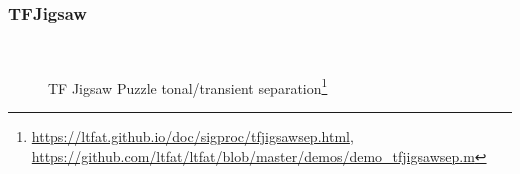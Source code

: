\documentclass{beamer}
\begin{document}
\begin{frame}
	\frametitle{TFJigsaw}
	\begin{figure}[ht]
		\vspace{-1em}
		\\
		\vspace{-1em}
		\caption{TF Jigsaw Puzzle tonal/transient separation\footnote{\url{https://ltfat.github.io/doc/sigproc/tfjigsawsep.html}, \url{https://github.com/ltfat/ltfat/blob/master/demos/demo_tfjigsawsep.m}}}
	\end{figure}
\end{frame}

\end{document}
